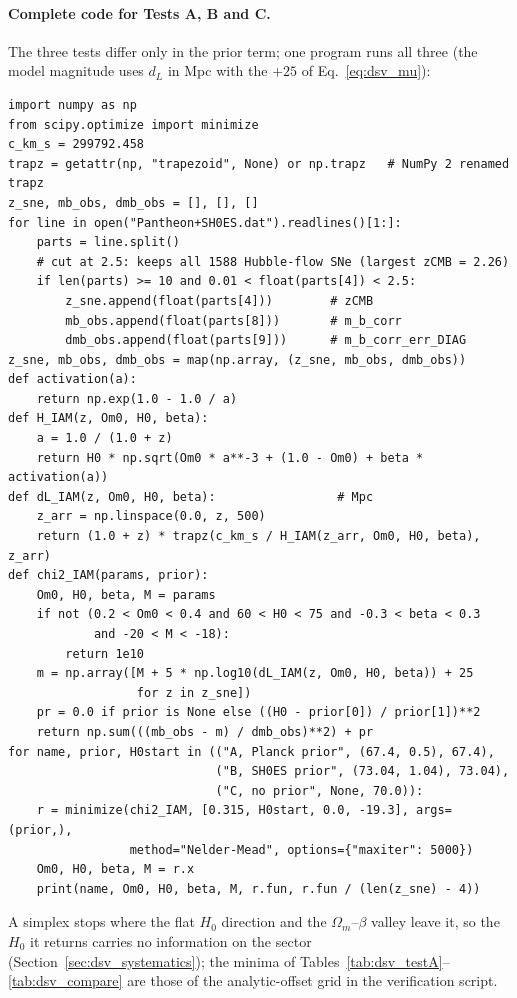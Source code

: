 \paragraph{Complete code for Tests A, B and C.} The three tests differ only in the prior term; one program runs all three (the model magnitude uses $d_L$ in
Mpc with the $+25$ of Eq.~\eqref{eq:dsv_mu}):
\begin{verbatim}
import numpy as np
from scipy.optimize import minimize
c_km_s = 299792.458
trapz = getattr(np, "trapezoid", None) or np.trapz   # NumPy 2 renamed trapz
z_sne, mb_obs, dmb_obs = [], [], []
for line in open("Pantheon+SH0ES.dat").readlines()[1:]:
    parts = line.split()
    # cut at 2.5: keeps all 1588 Hubble-flow SNe (largest zCMB = 2.26)
    if len(parts) >= 10 and 0.01 < float(parts[4]) < 2.5:
        z_sne.append(float(parts[4]))        # zCMB
        mb_obs.append(float(parts[8]))       # m_b_corr
        dmb_obs.append(float(parts[9]))      # m_b_corr_err_DIAG
z_sne, mb_obs, dmb_obs = map(np.array, (z_sne, mb_obs, dmb_obs))
def activation(a):
    return np.exp(1.0 - 1.0 / a)
def H_IAM(z, Om0, H0, beta):
    a = 1.0 / (1.0 + z)
    return H0 * np.sqrt(Om0 * a**-3 + (1.0 - Om0) + beta * activation(a))
def dL_IAM(z, Om0, H0, beta):                 # Mpc
    z_arr = np.linspace(0.0, z, 500)
    return (1.0 + z) * trapz(c_km_s / H_IAM(z_arr, Om0, H0, beta), z_arr)
def chi2_IAM(params, prior):
    Om0, H0, beta, M = params
    if not (0.2 < Om0 < 0.4 and 60 < H0 < 75 and -0.3 < beta < 0.3
            and -20 < M < -18):
        return 1e10
    m = np.array([M + 5 * np.log10(dL_IAM(z, Om0, H0, beta)) + 25
                  for z in z_sne])
    pr = 0.0 if prior is None else ((H0 - prior[0]) / prior[1])**2
    return np.sum(((mb_obs - m) / dmb_obs)**2) + pr
for name, prior, H0start in (("A, Planck prior", (67.4, 0.5), 67.4),
                             ("B, SH0ES prior", (73.04, 1.04), 73.04),
                             ("C, no prior", None, 70.0)):
    r = minimize(chi2_IAM, [0.315, H0start, 0.0, -19.3], args=(prior,),
                 method="Nelder-Mead", options={"maxiter": 5000})
    Om0, H0, beta, M = r.x
    print(name, Om0, H0, beta, M, r.fun, r.fun / (len(z_sne) - 4))
\end{verbatim}
A simplex stops where the flat $H_0$ direction and the $\Omega_m$--$\beta$ valley leave it, so the $H_0$ it returns carries no information on the sector
(Section~\ref{sec:dsv_systematics}); the minima of Tables~\ref{tab:dsv_testA}--\ref{tab:dsv_compare} are those of the analytic-offset grid in the
verification script.
